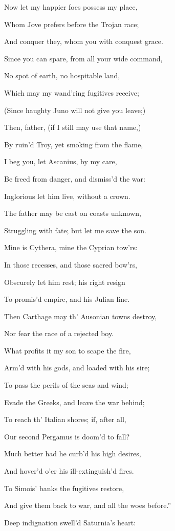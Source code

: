 Now let my happier foes possess my place,

Whom Jove prefers before the Trojan race;

And conquer they, whom you with conquest grace.

Since you can spare, from all your wide command,

No spot of earth, no hospitable land,

Which may my wand’ring fugitives receive;

(Since haughty Juno will not give you leave;)

Then, father, (if I still may use that name,)

By ruin’d Troy, yet smoking from the flame,

I beg you, let Ascanius, by my care,

Be freed from danger, and dismiss’d the war:

Inglorious let him live, without a crown.

The father may be cast on coasts unknown,

Struggling with fate; but let me save the son.

Mine is Cythera, mine the Cyprian tow’rs:

In those recesses, and those sacred bow’rs,

Obscurely let him rest; his right resign

To promis’d empire, and his Julian line.

Then Carthage may th’ Ausonian towns destroy,

Nor fear the race of a rejected boy.

What profits it my son to scape the fire,

Arm’d with his gods, and loaded with his sire;

To pass the perils of the seas and wind;

Evade the Greeks, and leave the war behind;

To reach th’ Italian shores; if, after all,

Our second Pergamus is doom’d to fall?

Much better had he curb’d his high desires,

And hover’d o’er his ill-extinguish’d fires.

To Simois’ banks the fugitives restore,

And give them back to war, and all the woes before.”

Deep indignation swell’d Saturnia’s heart:


